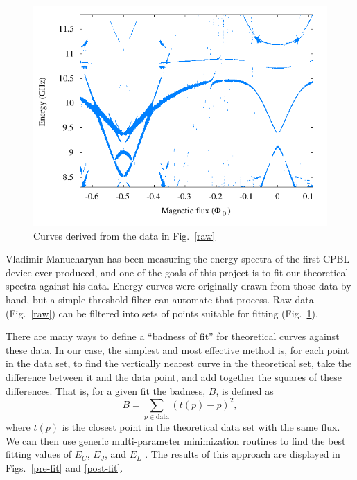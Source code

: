 \documentclass[twocolumn]{revtex4}
\begin{document}
\begin{figure}
\includegraphics[width=\linewidth]{CPBL-data.png}
\caption{ Curves derived from the data in Fig.~\ref{raw} }
\label{filter}
\end{figure}

Vladimir Manucharyan has been measuring the energy spectra of the
first CPBL device ever produced, and one of the goals of this project
is to fit our theoretical spectra against his data. Energy curves were
originally drawn from those data by hand, but a simple threshold
filter can automate that process. Raw data (Fig.~\ref{raw}) can be
filtered into sets of points suitable for fitting
(Fig.~\ref{filter}).

There are many ways to define a ``badness of fit'' for theoretical
curves against these data. In our case, the simplest and most
effective method is, for each point in the data set, to find the
vertically nearest curve in the theoretical set, take the difference
between it and the data point, and add together the squares of these
differences. That is, for a given fit the badness, $B$, is defined as
\begin{equation}
\label{badness}
B = \sum_{p \in \text{data}} (t(p)-p)^2,
\end{equation}
where $t(p)$ is the closest point in the theoretical data set with the
same flux. We can then use generic multi-parameter minimization
routines to find the best fitting values of $E_C$, $E_J$, and
$E_L$ \cite{Byrd,Zhu}. The results of this approach are displayed
in Figs.~\ref{pre-fit} and \ref{post-fit}.
\end{document}
